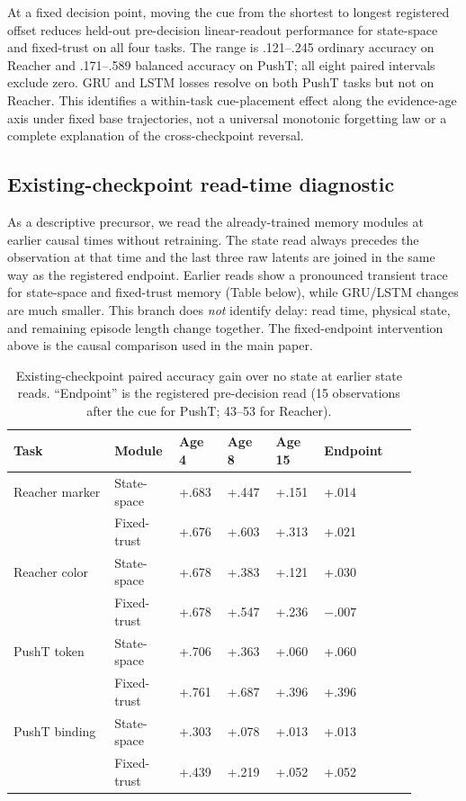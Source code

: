 At a fixed decision point, moving the cue from the shortest to longest registered offset reduces held-out pre-decision linear-readout performance for state-space and fixed-trust on all four tasks. The range is .121--.245 ordinary accuracy on Reacher and .171--.589 balanced accuracy on PushT; all eight paired intervals exclude zero. GRU and LSTM losses resolve on both PushT tasks but not on Reacher. This identifies a within-task cue-placement effect along the evidence-age axis under fixed base trajectories, not a universal monotonic forgetting law or a complete explanation of the cross-checkpoint reversal.

\subsection{Existing-checkpoint read-time diagnostic}

As a descriptive precursor, we read the already-trained memory modules at earlier causal times without retraining. The state read always precedes the observation at that time and the last three raw latents are joined in the same way as the registered endpoint. Earlier reads show a pronounced transient trace for state-space and fixed-trust memory (Table below), while GRU/LSTM changes are much smaller. This branch does \emph{not} identify delay: read time, physical state, and remaining episode length change together. The fixed-endpoint intervention above is the causal comparison used in the main paper.

\begin{table}[H]
\centering
\scriptsize
\setlength{\tabcolsep}{4.0pt}
\caption{Existing-checkpoint paired accuracy gain over no state at earlier state reads. ``Endpoint'' is the registered pre-decision read (15 observations after the cue for PushT; 43--53 for Reacher).}
\begin{tabularx}{\linewidth}{@{}>{\raggedright\arraybackslash}p{0.25\linewidth}>{\raggedright\arraybackslash}p{0.16\linewidth}*{4}{>{\centering\arraybackslash}p{0.12\linewidth}}Y@{}}
\toprule
Task & Module & Age 4 & Age 8 & Age 15 & Endpoint \\
\midrule
Reacher marker & State-space & +.683 & +.447 & +.151 & +.014 \\
 & Fixed-trust & +.676 & +.603 & +.313 & +.021 \\
Reacher color & State-space & +.678 & +.383 & +.121 & +.030 \\
 & Fixed-trust & +.678 & +.547 & +.236 & $-.007$ \\
PushT token & State-space & +.706 & +.363 & +.060 & +.060 \\
 & Fixed-trust & +.761 & +.687 & +.396 & +.396 \\
PushT binding & State-space & +.303 & +.078 & +.013 & +.013 \\
 & Fixed-trust & +.439 & +.219 & +.052 & +.052 \\
\bottomrule
\end{tabularx}
\end{table}

